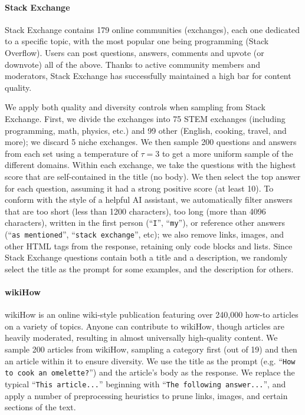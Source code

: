 \paragraph{Stack Exchange}
Stack Exchange contains 179 online communities (exchanges), each one dedicated to a specific topic, with the most popular one being programming (Stack Overflow).
Users can post questions, answers, comments and upvote (or downvote) all of the above.
Thanks to active community members and moderators, Stack Exchange has successfully maintained a high bar for content quality.

We apply both quality and diversity controls when sampling from Stack Exchange.
First, we divide the exchanges into 75 STEM exchanges (including programming, math, physics, etc.) and 99 other (English, cooking, travel, and more); we discard 5 niche exchanges.
We then sample 200 questions and answers from each set using a temperature of $\tau = 3$ to get a more uniform sample of the different domains.
Within each exchange, we take the questions with the highest score that are self-contained in the title (no body).
We then select the top answer for each question, assuming it had a strong positive score (at least 10).
To conform with the style of a helpful AI assistant, we automatically filter answers that are too short (less than 1200 characters), too long (more than 4096 characters), written in the first person (``\texttt{I}'', ``\texttt{my}''), or reference other answers (``\texttt{as mentioned}'', ``\texttt{stack exchange}'', etc);
we also remove links, images, and other HTML tags from the response, retaining only code blocks and lists.
Since Stack Exchange questions contain both a title and a description, we randomly select the title as the prompt for some examples, and the description for others.



\paragraph{wikiHow}
wikiHow is an online wiki-style publication featuring over 240,000 how-to articles on a variety of topics.
Anyone can contribute to wikiHow, though articles are heavily moderated, resulting in almost universally high-quality content.
We sample 200 articles from wikiHow, sampling a category first (out of 19) and then an article within it to ensure diversity.
We use the title as the prompt (e.g. ``\texttt{How to cook an omelette?}'') and the article's body as the response.
We replace the typical ``\texttt{This article...}'' beginning with ``\texttt{The following answer...}'', and apply a number of preprocessing heuristics to prune links, images, and certain sections of the text.

